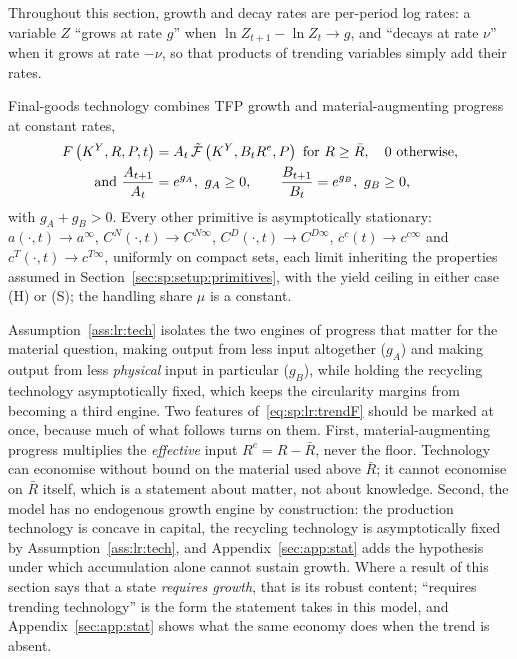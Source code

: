 Throughout this section, growth and decay rates are per-period log rates: a variable $Z$ ``grows at rate $g$'' when $\ln Z_{t+1}-\ln Z_t\to g$, and ``decays at rate $\nu$'' when it grows at rate $-\nu$, so that products of trending variables simply add their rates.

\begin{assumption}\label{ass:lr:tech}
Final-goods technology combines TFP growth and material-augmenting progress at constant rates,
\begin{align}
    F\left(K^Y,R,P,t\right) &= A_t\,\tilde{\mathcal F}\left(K^Y,B_tR^{e},P\right)\ \text{for }R\ge\bar R,\quad 0\text{ otherwise}, \label{eq:sp:lr:trendF} \\
    \text{and }\frac{A_{t+1}}{A_t}&=e^{g_A},\ g_A\ge0, \qquad
    \frac{B_{t+1}}{B_t}=e^{g_B},\ g_B\ge0, \notag
\end{align}
with $g_A+g_B>0$. Every other primitive is asymptotically stationary: $a\left(\cdot,t\right)\to a^\infty$, $C^N\left(\cdot,t\right)\to C^{N\infty}$, $C^D\left(\cdot,t\right)\to C^{D\infty}$, $c^c(t)\to c^{c\infty}$ and $c^T\left(\cdot,t\right)\to c^{T\infty}$, uniformly on compact sets, each limit inheriting the properties assumed in Section~\ref{sec:sp:setup:primitives}, with the yield ceiling in either case (H) or (S); the handling share $\mu$ is a constant.
\end{assumption}

Assumption~\ref{ass:lr:tech} isolates the two engines of progress that matter for the material question, making output from less input altogether ($g_A$) and making output from less \emph{physical} input in particular ($g_B$), while holding the recycling technology asymptotically fixed, which keeps the circularity margins from becoming a third engine. Two features of~\eqref{eq:sp:lr:trendF} should be marked at once, because much of what follows turns on them. First, material-augmenting progress multiplies the \emph{effective} input $R^e=R-\bar R$, never the floor. Technology can economise without bound on the material used above $\bar R$; it cannot economise on $\bar R$ itself, which is a statement about matter, not about knowledge. Second, the model has no endogenous growth engine by construction: the production technology is concave in capital, the recycling technology is asymptotically fixed by Assumption~\ref{ass:lr:tech}, and Appendix~\ref{sec:app:stat} adds the hypothesis under which accumulation alone cannot sustain growth. Where a result of this section says that a state \emph{requires growth}, that is its robust content; ``requires trending technology'' is the form the statement takes in this model, and Appendix~\ref{sec:app:stat} shows what the same economy does when the trend is absent.

